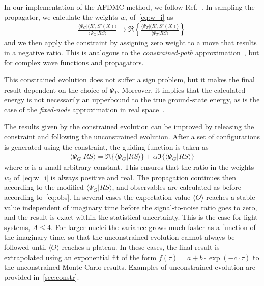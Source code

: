 \documentclass[aps,prc,twocolumn,superscriptaddress,floatfix]{revtex4-1}
\begin{document}
In our implementation of the AFDMC method, we follow Ref.~\cite{Zhang:2003}. 
In sampling the propagator, we calculate the weights $w_i$ of~\cref{eq:w_i} as
\begin{align}
\frac{\langle\Psi_G|(R',S'(X)\rangle}{\langle\Psi_G|RS\rangle}\rightarrow
\Re\left\{\frac{\langle\Psi_T|(R',S'(X)\rangle}{\langle\Psi_T|RS\rangle}\right\}\,
\end{align}
and we then apply the constraint by assigning zero weight to a move
that results in a negative ratio. This is analogous to the \emph{constrained-path} 
approximation~\cite{Zhang:1997}, but for complex wave functions and propagators.

This constrained evolution does not suffer a sign problem, but it makes the final result
dependent on the choice of $\Psi_T$. Moreover, it implies that the calculated energy is not necessarily
an upperbound to the true ground-state energy, as is the case of the \emph{fixed-node} approximation 
in real space~\cite{Ortiz:1993,Foulkes:2001}.

The results given by the constrained evolution can be improved by releasing the 
constraint and following the unconstrained evolution.
After a set of configurations is generated using the constraint, the guiding function
is taken as
\begin{align}
\langle\Psi_G|RS\rangle=\Re\big\{\langle\Psi_G|RS\rangle\big\}+\alpha\Im\big\{\langle\Psi_G|RS\rangle\big\}
\end{align}
where $\alpha$ is a small arbitrary constant.
This ensures that the ratio in the weights $w_i$ of~\cref{eq:w_i} is always positive and real.
The propagation continues then according to the modified $\langle\Psi_G|RS\rangle$, and 
observables are calculated as before according to~\cref{eq:obs}.
In several cases the expectation value $\langle O\rangle$ reaches a stable value independent
of imaginary time before the signal-to-noise ratio goes to zero, and the result is exact 
within the statistical uncertainty.
This is the case for light systems, $A\le4$. For larger nuclei the variance grows much faster 
as a function of the imaginary time, so that the unconstrained evolution cannot always be 
followed until $\langle O\rangle$ reaches a plateau. In these cases, the final result is
extrapolated using an exponential fit of the form $f(\tau)=a+b\cdot\exp(-c\cdot\tau)$ to the unconstrained
Monte Carlo results. Examples of unconstrained evolution are provided in~\cref{sec:constr}.
\end{document}
